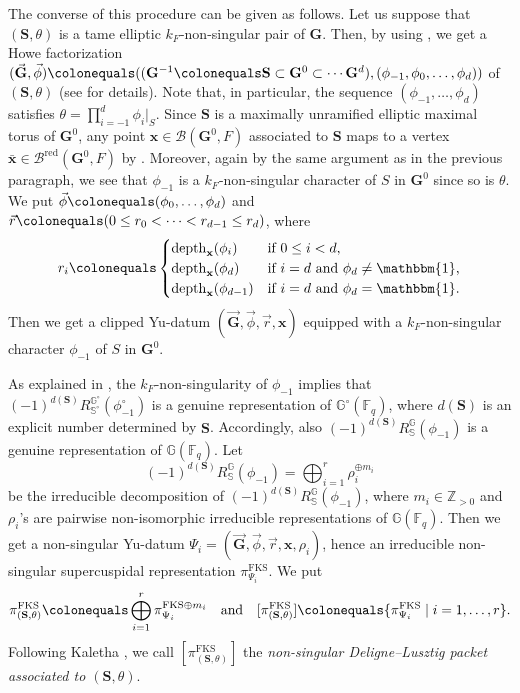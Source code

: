 \documentclass{amsart}
\newcommand{\red}{\mathrm{red}}
\newcommand{\FKS}{\mathrm{FKS}}
\newcommand{\x}{\mathbf{x}}
\newcommand{\Z}{\mathbb{Z}}
\newcommand{\F}{\mathbb{F}}
\newcommand{\bbS}{\mathbb{S}}
\newcommand{\bbG}{\mathbb{G}}
\newcommand{\bfG}{\mathbf{G}}
\newcommand{\bfS}{\mathbf{S}}
\newcommand{\mcB}{\mathcal{B}}
\DeclareMathOperator{\depth}{depth}
\theoremstyle{plain}
\theoremstyle{definition}
\theoremstyle{remark}
\theoremstyle{theorem}
\begin{document}
The converse of this procedure can be given as follows.
Let us suppose that $(\bfS,\theta)$ is a tame elliptic $k_{F}$-non-singular pair of $\bfG$.
Then, by using \cite[Proposition 3.6.7]{Kal19}, we get a Howe factorization $(\vec{\bfG},\vec{\phi})\colonequals ((\bfG^{-1}\colonequals \bfS\subset\bfG^{0}\subset\cdots\bfG^{d}),(\phi_{-1},\phi_{0},\ldots,\phi_{d}))$ of $(\bfS,\theta)$ (see \cite[Section 3.6]{Kal19} for details).
Note that, in particular, the sequence $(\phi_{-1},\ldots,\phi_{d})$ satisfies $\theta=\prod_{i=-1}^{d}\phi_{i}|_{S}$.
Since $\bfS$ is a maximally unramified elliptic maximal torus of $\bfG^{0}$, any  point $\x\in\mcB(\bfG^{0},F)$ associated to $\bfS$ maps to a vertex $\bar{\x}\in\mcB^{\red}(\bfG^{0},F)$ by \cite[Lemma 3.4.3]{Kal19}.
Moreover, again by the same argument as in the previous paragraph, we see that $\phi_{-1}$ is a $k_{F}$-non-singular character of $S$ in $\bfG^{0}$ since so is $\theta$.
We put $\vec{\phi}\colonequals (\phi_{0},\ldots,\phi_{d})$ and $\vec{r}\colonequals (0\leq r_{0}<\cdots<r_{d-1}\leq r_{d})$, where 
\[
r_{i}
\colonequals 
\begin{cases}
\depth_{\x}(\phi_{i}) & \text{if $0\leq i<d$,}\\
\depth_{\x}(\phi_{d}) & \text{if $i=d$ and $\phi_{d}\neq\mathbbm{1}$,}\\
\depth_{\x}(\phi_{d-1}) & \text{if $i=d$ and $\phi_{d}=\mathbbm{1}$.}
\end{cases}
\]
Then we get a clipped Yu-datum $(\vec{\bfG},\vec{\phi},\vec{r},\x)$ equipped with a $k_{F}$-non-singular character $\phi_{-1}$ of $S$ in $\bfG^{0}$.

As explained in \cite[Section 2.4]{Kal19-sc}, the $k_{F}$-non-singularity of $\phi_{-1}$ implies that $(-1)^{d(\bfS)}R_{\bbS^{\circ}}^{\bbG^{\circ}}(\phi_{-1}^{\circ})$ is a genuine representation of $\bbG^{\circ}(\F_{q})$, where $d(\bfS) $ is an explicit number determined by $\bfS$.
Accordingly, also $(-1)^{d(\bfS)}R_{\bbS}^{\bbG}(\phi_{-1})$ is a genuine representation of $\bbG(\F_{q})$.
Let 
\[
(-1)^{d(\bfS)}R_{\bbS}^{\bbG}(\phi_{-1})
=\bigoplus_{i=1}^{r} \rho_{i}^{\oplus m_{i}}
\]
be the irreducible decomposition of $(-1)^{d(\bfS)}R_{\bbS}^{\bbG}(\phi_{-1})$, where $m_{i}\in\Z_{>0}$ and $\rho_{i}$'s are pairwise non-isomorphic irreducible representations of $\bbG(\F_{q})$.
Then we get a non-singular Yu-datum $\Psi_{i}=(\vec{\bfG},\vec{\phi},\vec{r},\x,\rho_{i})$, hence an irreducible non-singular supercuspidal representation $\pi_{\Psi_{i}}^{\FKS}$.
We put
\[
\pi_{(\bfS,\theta)}^{\FKS}
\colonequals \bigoplus_{i=1}^{r} \pi_{\Psi_{i}}^{\FKS\oplus m_{i}}
\quad\text{and}\quad
[\pi_{(\bfS,\theta)}^{\FKS}]
\colonequals \{\pi_{\Psi_{i}}^{\FKS}\mid i=1,\ldots,r\}.
\]
Following Kaletha \cite{Kal19-sc}, we call $[\pi_{(\bfS,\theta)}^{\FKS}]$ the \textit{non-singular Deligne--Lusztig packet associated to $(\bfS,\theta)$}.
\end{document}

